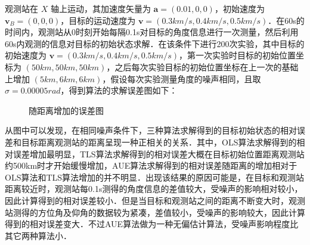 观测站在 $X$ 轴上运动，其加速度矢量为 $\bm{a}=(0.01,0,0)$，初始速度为 $\bm{v}_B = (0,0,0)$，目标的运动速度为 $\bm{v} = (0.3km/s,0.4km/s,0.5km/s)$．在60s的时间内，观测站从0时刻开始每隔0.1s对目标的角度信息进行一次测量，然后利用60s内观测的信息对目标的初始状态求解．在该条件下进行200次实验，其中目标的初始速度为 $\bm{v}=(0.3km/s,0.4km/s,0.5km/s)$，第一次实验时目标的初始位置坐标为 $(50km,50km,50km)$，之后每次实验目标的初始位置坐标在上一次的基础上增加 $(5km,6km,6km)$，假设每次实验测量角度的噪声相同，且取$\sigma=0.00005rad$，得到算法的求解误差图如下：
\newpage
\begin{figure}[htbp]
	\vspace{13pt}
	\centering

	\caption{随距离增加的误差图}
\end{figure}

从图中可以发现，在相同噪声条件下，三种算法求解得到的目标初始状态的相对误差和目标距离观测站的距离呈现一种正相关的关系．其中，OLS算法求解得到的相对误差增加最明显，TLS算法求解得到的相对误差大概在目标初始位置距离观测站约500km时才开始缓慢增加，AUE算法求解得到的相对误差随距离的增加相对于OLS算法和TLS算法增加的并不明显．出现该结果的原因可能是，在目标和观测站距离较近时，观测站每0.1s测得的角度信息的差值较大，受噪声的影响相对较小，因此计算得到的相对误差较小．但是当目标和观测站之间的距离不断变大时，观测站测得的方位角及仰角的数据较为紧凑，差值较小，受噪声的影响较大，因此计算得到的相对误差变大．不过AUE算法做为一种无偏估计算法，受噪声影响程度比其它两种算法小．

